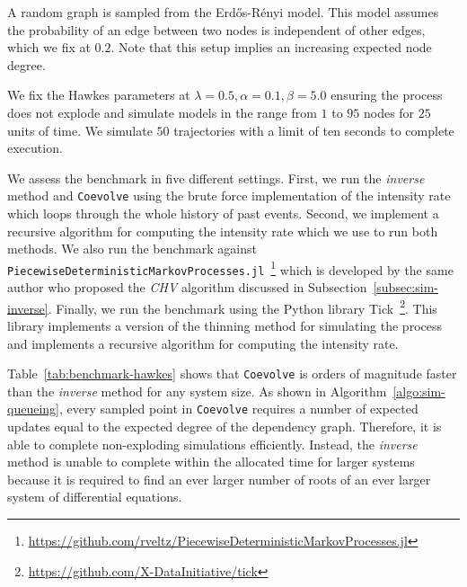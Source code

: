 \documentclass{juliacon}
\begin{document}
A random graph is sampled from the Erd\H{o}s-Rényi model. This model assumes the probability of an edge between two nodes is independent of other edges, which we fix at \( 0.2 \). Note that this setup implies an increasing expected node degree.

We fix the Hawkes parameters at \( \lambda = 0.5 , \alpha = 0.1 , \beta = 5.0 \) ensuring the process does not explode and simulate models in the range from \( 1 \) to \( 95 \) nodes for \( 25 \) units of time. We simulate \( 50 \) trajectories with a limit of ten seconds to complete execution.

We assess the benchmark in five different settings. First, we run the \textit{inverse} method and \texttt{Coevolve} using the brute force implementation of the intensity rate which loops through the whole history of past events. Second, we implement a recursive algorithm for computing the intensity rate which we use to run both methods. We also run the benchmark against \texttt{PiecewiseDeterministicMarkovProcesses.jl}~\footnote{\url{https://github.com/rveltz/PiecewiseDeterministicMarkovProcesses.jl}} which is developed by the same author who proposed the \textit{CHV} algorithm discussed in Subsection~\ref{subsec:sim-inverse}. Finally, we run the benchmark using the Python library Tick~\footnote{\url{https://github.com/X-DataInitiative/tick}}. This library implements a version of the thinning method for simulating the process and implements a recursive algorithm for computing the intensity rate.

Table~\ref{tab:benchmark-hawkes} shows that \texttt{Coevolve} is orders of magnitude faster than the \textit{inverse} method for any system size. As shown in Algorithm~\ref{algo:sim-queueing}, every sampled point in \texttt{Coevolve} requires a number of expected updates equal to the expected degree of the dependency graph. Therefore, it is able to complete non-exploding simulations efficiently. Instead, the \textit{inverse} method is unable to complete within the allocated time for larger systems because it is required to find an ever larger number of roots of an ever larger system of differential equations.
\end{document}
